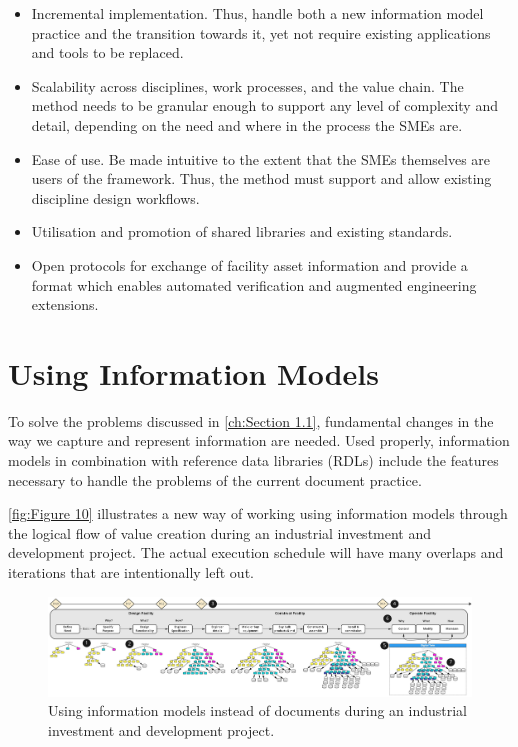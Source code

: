 \documentclass[../main.tex]{subfiles}
\begin{document}
\begin{itemize}
  \item Incremental implementation. Thus, handle both a new information model practice and the transition towards it,
        yet not require existing applications and tools to be replaced.
  \item Scalability across disciplines, work processes, and the value chain. The method needs to be granular enough to
        support any level of complexity and detail, depending on the need and where in the process the SMEs are.
  \item Ease of use. Be made intuitive to the extent that the SMEs themselves are users of the framework. Thus, the
        method must support and allow existing discipline design workflows.
  \item Utilisation and promotion of shared libraries and existing standards.
  \item Open protocols for exchange of facility asset information and provide a format which enables automated
        verification and augmented engineering extensions.
\end{itemize}

\section{Using Information Models}
\label{sec:userinformationmodel}
To solve the problems discussed in \autoref{ch:Section 1.1}, fundamental
changes in the way we capture and represent information are needed. Used properly, information models in
combination with reference data libraries (RDLs) include the features necessary to handle the problems of the current
document practice.

\autoref{fig:Figure 10} illustrates a new way of working using information models through the logical flow of value
creation during an industrial investment and development project. The actual execution schedule will have many
overlaps and iterations that are intentionally left out.

\begin{figure}[htb]
  \centering
  \includegraphics[width=1\textwidth]{img/IMFmanual-img010.jpg}
  \caption{Using information models instead of documents during an
    industrial investment and development project.}
  \label{fig:Figure 10}
\end{figure}
\end{document}

